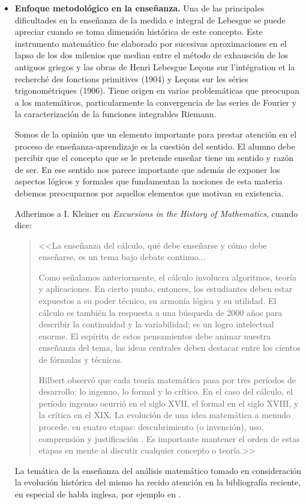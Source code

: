 \documentclass[12pt]{article}
\begin{document}
\begin{itemize}
\item \textbf{Enfoque metodológico en la enseñanza.} Una de las principales dificultades en la enseñanza  de la medida e integral de Lebesgue se puede apreciar cuando se toma dimensión histórica de este concepto.  Este instrumento matemático fue elaborado por sucesivas aproximaciones en el lapso de los dos milenios que median entre el método de exhausción de los antiguos griegos y las obras de Henri Lebesgue Leçons sur l'intégration et la recherché des fonctions primitives (1904) y Leçons sur les séries trigonométriques (1906). Tiene origen en varias problemáticas que preocupan a los matemáticos, particularmente  la convergencia de las series de Fourier y la caracterización de la funciones integrables Riemann. 

Somos de la opinión que un elemento importante para prestar atención en el proceso de enseñanza-aprendizaje es la cuestión del sentido. El alumno debe percibir que el concepto que se le pretende enseñar tiene un sentido y razón de ser. En ese sentido nos parece importante que además de exponer los aspectos lógicos y formales que fundamentan la nociones de esta materia debemos preocuparnos por aquellos elementos que motivan su existencia. 

Adherimos a I. Kleiner en \emph{Excursions in the History of Mathematics}, cuando dice:

\begin{quote}
<<La enseñanza del cálculo, qué debe enseñarse y cómo debe enseñarse, es
un tema bajo debate continuo...

Como señalamos anteriormente, el cálculo involucra algoritmos, teoría y aplicaciones.
En cierto punto, entonces, los estudiantes deben estar expuestos a su poder técnico, su 
armonía lógica  y su utilidad. El cálculo es también la respuesta a una búsqueda de 2000 años para describir la continuidad y la variabilidad; es un logro intelectual enorme. El espíritu de estos pensamientos debe animar nuestra enseñanza del tema, las ideas centrales deben destacar entre los cientos de fórmulas y técnicas.

Hilbert observó que cada teoría matemática pasa por tres períodos de
desarrollo: lo ingenuo, lo formal y lo crítico. En el caso del cálculo, el
período ingenuo ocurrió en el siglo XVII, el formal en el siglo XVIII, y
la crítica en el XIX. La evolución de una idea matemática a menudo procede.
en cuatro etapas: descubrimiento (o invención), uso, comprensión y justificación . Es importante mantener el orden de estas etapas en mente al discutir cualquier concepto o teoría.>>
\end{quote}

La temática de la enseñanza del análisis matemático tomado en consideración  la evolución histórica del mismo ha recido atención en la bibliografía reciente, en especial de habla inglesa, por ejemplo en \cite{bressoud2008radical,hawkins2001lebesgue, bressoud2007radical,abbott2002understanding,hairer2008analysis}.


\end{itemize}
\end{document}

